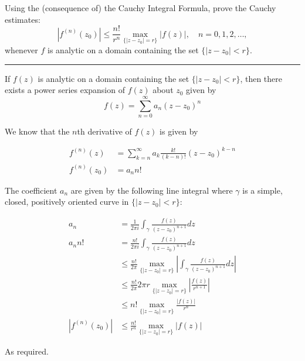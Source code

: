 \begin{example}

    Using the (consequence of) the Cauchy Integral Formula, prove the Cauchy estimates:
    \[
        \left| f^{(n)}(z_0) \right| \leq \frac{n!}{r^n} \max_{\{|z - z_0| = r\}} |f(z)|, \quad n = 0, 1, 2, \dots,
    \]
    whenever \( f \) is analytic on a domain containing the set \( \{ |z - z_0| < r \} \).

    \hrule
    \vspace{0.5cm}

    If $f(z)$ is analytic on a domain containing the set $\{|z - z_0| < r\}$, then there exists a power series expansion of $f(z)$ about $z_0$ given by
    \begin{equation}
        f(z) = \sum_{n=0}^{\infty} a_n (z - z_0)^n
    \end{equation}

    We know that the \(n\)th derivative of \(f(z)\) is given by

    \begin{align*}
        f^{(n)}(z)   & = \sum_{k=n}^{\infty} a_k \frac{k!}{(k-n)!} (z - z_0)^{k-n} \\
        f^{(n)}(z_0) & = a_n n!
    \end{align*}

    The coefficient \(a_n\) are given by the following line integral where $\gamma$ is a simple, closed, positively oriented curve in $\{|z - z_0| < r\}$:

    \begin{align*}
        a_n            & = \frac{1}{2\pi i}\int_{\gamma} \frac{f(z)}{(z - z_0)^{n+1}} dz                                          \\
        a_n n!         & = \frac{n!}{2\pi i}\int_{\gamma} \frac{f(z)}{(z - z_0)^{n+1}} dz                                         \\
                       & \leq \frac{n!}{2\pi} \max_{\{|z - z_0| = r\}} \left|\int_{\gamma} \frac{f(z)}{(z - z_0)^{n+1}} dz\right| \\
                       & \leq \frac{n!}{2\pi} 2\pi r\max_{\{|z - z_0| = r\}} |\frac{f(z)}{r^{n+1}}|                               \\
                       & \leq n! \max_{\{|z - z_0| = r\}} \frac{|f(z)|}{r^{n}}                                                    \\
        |f^{(n)}(z_0)| & \leq \frac{n!}{r^{n}} \max_{\{|z - z_0| = r\}} |f(z)|
    \end{align*}

    As required.
\end{example}

